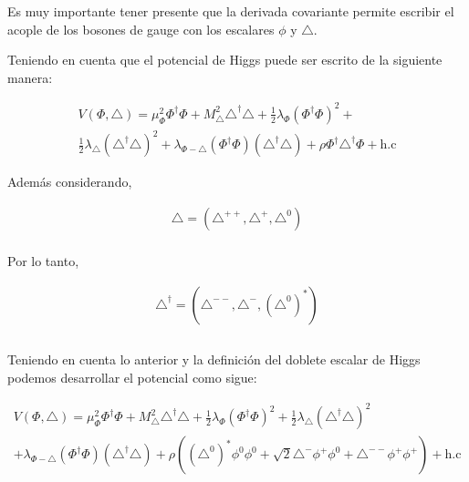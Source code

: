 \documentclass[12pt]{article}
\begin{document}
Es muy importante tener presente que la derivada covariante permite escribir el acople de los bosones de gauge con los escalares \(\phi\) y \(\triangle\).

Teniendo en cuenta que el potencial de Higgs puede ser escrito de la siguiente manera: 

\begin{equation}
    \begin{aligned}
    \label{eq:POtencialMAjorana}
V(\Phi, \triangle)= \mu^2_\Phi\Phi^\dagger\Phi + M^2_\triangle\triangle^\dagger\triangle +  \frac{1}{2}\lambda_\Phi (\Phi^\dagger\Phi)^2 + \\ 
\frac{1}{2}\lambda_\triangle (\triangle^\dagger\triangle)^2 + \lambda_{\Phi-\triangle} (\Phi^\dagger\Phi)(\triangle^\dagger\triangle)+ \rho\Phi^\dagger\triangle^\dagger\Phi + \text{h.c}
    \end{aligned}
\end{equation}

Además considerando,  
 
\begin{equation}
\begin{aligned}
 \triangle= (\triangle^{++}   , \triangle^{+}  ,  \triangle^{0} )  \\ 
\end{aligned}
\end{equation}

Por lo tanto, 

\begin{equation}
\begin{aligned}
 \triangle^\dagger = (  \triangle^{--}  , \triangle^{-}  , (\triangle^{0})^*    )\\ 
\end{aligned}
\end{equation} \\

Teniendo en cuenta lo anterior y la definición del doblete escalar de 
Higgs podemos desarrollar el potencial como sigue: 


\begin{equation}
    \begin{aligned}
    \label{eq:POtencialMAjorana1}
V(\Phi, \triangle)= \mu^2_\Phi\Phi^\dagger\Phi + M^2_\triangle\triangle^\dagger\triangle +  \frac{1}{2}\lambda_\Phi (\Phi^\dagger\Phi)^2 + 
\frac{1}{2}\lambda_\triangle (\triangle^\dagger\triangle)^2 \\ 
+ \lambda_{\Phi-\triangle} (\Phi^\dagger\Phi)(\triangle^\dagger\triangle)
+ \rho((\triangle^{0})^*\phi^0\phi^0 + \sqrt{2}\triangle^-\phi^+\phi^0+\triangle^{--}\phi^{+}\phi^{+} ) + \text{h.c}
    \end{aligned}
\end{equation} \\
\end{document}
